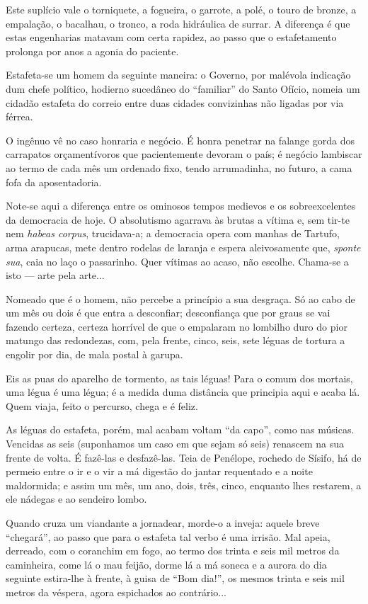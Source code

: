 Este suplício vale o torniquete, a fogueira, o garrote, a polé, o touro
de bronze, a empalação, o bacalhau, o tronco, a roda hidráulica de
surrar. A diferença é que estas engenharias matavam com certa rapidez,
ao passo que o estafetamento prolonga por anos a agonia do paciente.

Estafeta-se um homem da seguinte maneira: o Governo, por malévola
indicação dum chefe político, hodierno sucedâneo do ``familiar'' do
Santo Ofício, nomeia um cidadão estafeta do correio entre duas cidades
convizinhas não ligadas por via férrea.

O ingênuo vê no caso honraria e negócio. É honra penetrar na falange
gorda dos carrapatos orçamentívoros que pacientemente devoram o país; é
negócio lambiscar ao termo de cada mês um ordenado fixo, tendo
arrumadinha, no futuro, a cama fofa da aposentadoria.

Note-se aqui a diferença entre os ominosos tempos medievos e os
sobreexcelentes da democracia de hoje. O absolutismo agarrava às brutas
a vítima e, sem tir-te nem \emph{habeas corpus}, trucidava-a; a
democracia opera com manhas de Tartufo, arma arapucas, mete dentro
rodelas de laranja e espera aleivosamente que, \emph{sponte sua}, caia
no laço o passarinho. Quer vítimas ao acaso, não escolhe. Chama-se a
isto --- arte pela arte...

Nomeado que é o homem, não percebe a princípio a sua desgraça. Só ao
cabo de um mês ou dois é que entra a desconfiar; desconfiança que por
graus se vai fazendo certeza, certeza horrível de que o empalaram no
lombilho duro do pior matungo das redondezas, com, pela frente, cinco,
seis, sete léguas de tortura a engolir por dia, de mala postal à garupa.

Eis as puas do aparelho de tormento, as tais léguas! Para o comum dos
mortais, uma légua é uma légua; é a medida duma distância que principia
aqui e acaba lá. Quem viaja, feito o percurso, chega e é feliz.

As léguas do estafeta, porém, mal acabam voltam ``da capo'', como nas
músicas. Vencidas as seis (suponhamos um caso em que sejam só seis)
renascem na sua frente de volta. É fazê-las e desfazê-las. Teia de
Penélope, rochedo de Sísifo, há de permeio entre o ir e o vir a má
digestão do jantar requentado e a noite maldormida; e assim um mês, um
ano, dois, três, cinco, enquanto lhes restarem, a ele nádegas e ao
sendeiro lombo.

Quando cruza um viandante a jornadear, morde-o a inveja: aquele breve
``chegará'', ao passo que para o estafeta tal verbo é uma irrisão. Mal
apeia, derreado, com o coranchim em fogo, ao termo dos trinta e seis mil
metros da caminheira, come lá o mau feijão, dorme lá a má soneca e a
aurora do dia seguinte estira-lhe à frente, à guisa de ``Bom dia!'', os
mesmos trinta e seis mil metros da véspera, agora espichados ao
contrário...

